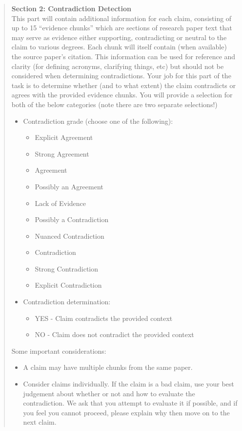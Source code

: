 \begin{quote}
\textbf{Section 2: Contradiction Detection}\\
This part will contain additional information for each claim, consisting of up to 15 ``evidence chunks'' which are sections of research paper text that may serve as evidence either supporting, contradicting or neutral to the claim to various degrees.
Each chunk will itself contain (when available) the source paper's citation. This information can be used for reference and clarity (for defining acronyms, clarifying things, etc) but should not be considered when determining contradictions.
Your job for this part of the task is to determine whether (and to what extent) the claim contradicts or agrees with the provided evidence chunks. You will provide a selection for both of the below categories (note there are two separate selections!)
\begin{itemize}
    \item Contradiction grade (choose one of the following):
        \begin{itemize}
            \item Explicit Agreement
            \item Strong Agreement
            \item Agreement
            \item Possibly an Agreement
            \item Lack of Evidence
            \item Possibly a Contradiction
            \item Nuanced Contradiction
            \item Contradiction
            \item Strong Contradiction
            \item Explicit Contradiction
        \end{itemize}
    \item Contradiction determination:
        \begin{itemize}
            \item YES - Claim contradicts the provided context
            \item NO - Claim does not contradict the provided context
        \end{itemize}
\end{itemize}
Some important considerations:
\begin{itemize}
    \item A claim may have multiple chunks from the same paper.
    \item Consider claims individually. If the claim is a bad claim, use your best judgement about whether or not and how to evaluate the contradiction. We ask that you attempt to evaluate it if possible, and if you feel you cannot proceed, please explain why then move on to the next claim.

\end{itemize}
\end{quote}
